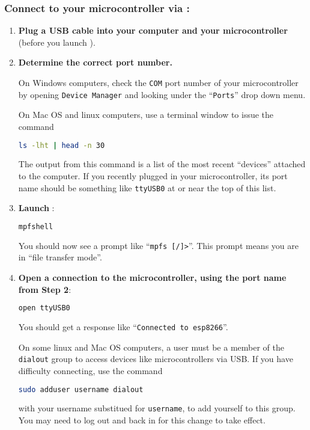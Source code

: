 \subsubsection{\howto Connect to your microcontroller via \mpfshell:}

\begin{enumerate}
\item \textbf{Plug a USB cable into your computer and your microcontroller} (before you launch \mpfshell). 
\item \textbf{Determine the correct port number.}

	On Windows computers, check the \texttt{COM} port number of your microcontroller by opening \texttt{Device Manager} and looking under the ``\texttt{Ports}'' drop down menu. 

	\smallskip
	On Mac OS and linux computers, use a terminal window to issue the command
\begin{lstlisting}[language=bash]
ls -lht | head -n 30
\end{lstlisting}
	The output from this command is a list of the most recent ``devices'' attached to the computer. 
	If you recently plugged in your microcontroller, its port name should be something like \texttt{ttyUSB0} at or near the top of this list.	
	\item \textbf{Launch \mpfshell}: 
\begin{lstlisting}[language=bash]
mpfshell
\end{lstlisting}
	You should now see a prompt like ``\verb|mpfs [/]>|''. 
	This prompt means you are in ``file transfer mode''. 
	\item \textbf{Open a connection to the microcontroller, using the port name from Step 2}:
\begin{lstlisting}[language=bash]
open ttyUSB0
\end{lstlisting}
	You should get a response like ``\texttt{Connected to esp8266}''.

	\smallskip
	On some linux and Mac OS computers, a user must be a member of the \texttt{dialout} group to access devices like microcontrollers via USB. 
	If you have difficulty connecting, use the command
\begin{lstlisting}[language=bash]
sudo adduser username dialout
\end{lstlisting}
	with your username substitued for \texttt{username}, to add yourself to this group. 
	You may need to log out and back in for this change to take effect.
	

\end{enumerate}
